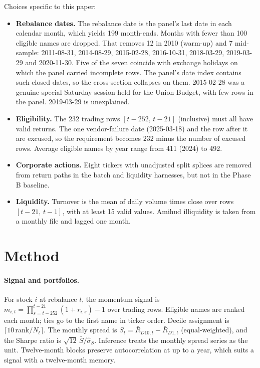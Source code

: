 \documentclass[11pt]{article}
\begin{document}
Choices specific to this paper:
\begin{itemize}
\item \textbf{Rebalance dates.} The rebalance date is the panel's last date in each
calendar month, which yields 199 month-ends. Months with fewer than 100 eligible names
are dropped. That removes 12 in 2010 (warm-up) and 7 mid-sample: 2011-08-31,
2014-08-29, 2015-02-28, 2016-10-31, 2018-03-29, 2019-03-29 and 2020-11-30. Five of the
seven coincide with exchange holidays on which the panel carried incomplete rows. The
panel's date index contains such closed dates, so the cross-section collapses on them.
2015-02-28 was a genuine special Saturday session held for the Union Budget, with few
rows in the panel. 2019-03-29 is unexplained.
\item \textbf{Eligibility.} The 232 trading rows $[t-252,\,t-21]$ (inclusive) must all
have valid returns. The one vendor-failure date (2025-03-18) and the row after it are
excused, so the requirement becomes $232$ minus the number of excused rows. Average
eligible names by year range from 411 (2024) to 492.
\item \textbf{Corporate actions.} Eight tickers with unadjusted split splices are
removed from return paths in the batch and liquidity harnesses, but not in the Phase B
baseline.
\item \textbf{Liquidity.} Turnover is the mean of daily volume times close over rows
$[t-21,\,t-1]$, with at least 15 valid values. Amihud illiquidity \citep{amihud2002} is
taken from a monthly file and lagged one month.
\end{itemize}

\section{Method}

\paragraph{Signal and portfolios.} For stock $i$ at rebalance $t$, the momentum signal is
$m_{i,t}=\prod_{s=t-252}^{t-21}(1+r_{i,s})-1$ over trading rows. Eligible names are
ranked each month; ties go to the first name in ticker order. Decile assignment is
$\lceil 10\,\mathrm{rank}/N_t\rceil$. The monthly spread is
$S_t=\bar R_{D10,t}-\bar R_{D1,t}$ (equal-weighted), and the Sharpe ratio is
$\sqrt{12}\,\bar S/\hat\sigma_S$. Inference treats the monthly spread series as the unit.
Twelve-month blocks preserve autocorrelation at up to a year, which suits a signal with a
twelve-month memory.
\end{document}
